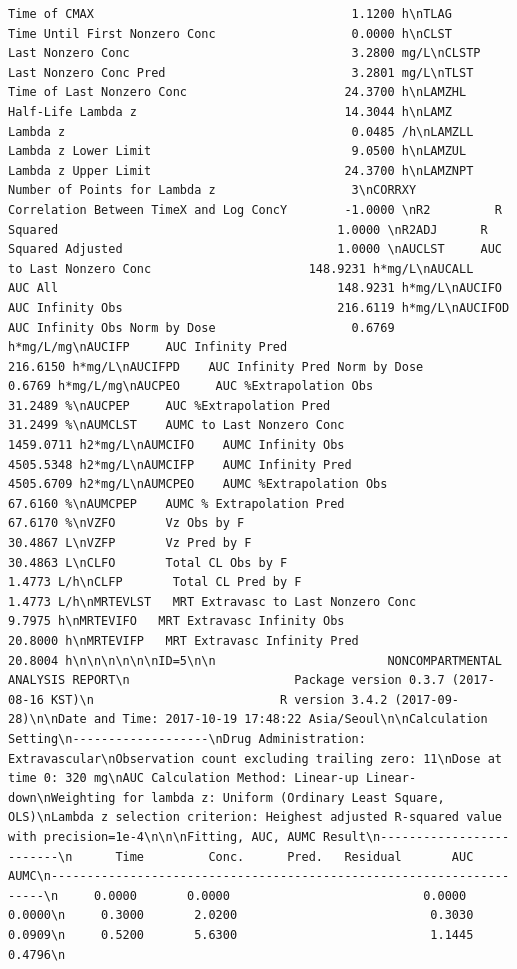 \documentclass[]{krantz}
\theoremstyle{definition}
\theoremstyle{definition}
\theoremstyle{definition}
\theoremstyle{remark}
\begin{document}
\begin{verbatim}
Time of CMAX                                    1.1200 h\nTLAG       Time Until First Nonzero Conc                   0.0000 h\nCLST       Last Nonzero Conc                               3.2800 mg/L\nCLSTP      Last Nonzero Conc Pred                          3.2801 mg/L\nTLST       Time of Last Nonzero Conc                      24.3700 h\nLAMZHL     Half-Life Lambda z                             14.3044 h\nLAMZ       Lambda z                                        0.0485 /h\nLAMZLL     Lambda z Lower Limit                            9.0500 h\nLAMZUL     Lambda z Upper Limit                           24.3700 h\nLAMZNPT    Number of Points for Lambda z                   3\nCORRXY     Correlation Between TimeX and Log ConcY        -1.0000 \nR2         R Squared                                       1.0000 \nR2ADJ      R Squared Adjusted                              1.0000 \nAUCLST     AUC to Last Nonzero Conc                      148.9231 h*mg/L\nAUCALL     AUC All                                       148.9231 h*mg/L\nAUCIFO     AUC Infinity Obs                              216.6119 h*mg/L\nAUCIFOD    AUC Infinity Obs Norm by Dose                   0.6769 h*mg/L/mg\nAUCIFP     AUC Infinity Pred                             216.6150 h*mg/L\nAUCIFPD    AUC Infinity Pred Norm by Dose                  0.6769 h*mg/L/mg\nAUCPEO     AUC %Extrapolation Obs                         31.2489 %\nAUCPEP     AUC %Extrapolation Pred                        31.2499 %\nAUMCLST    AUMC to Last Nonzero Conc                    1459.0711 h2*mg/L\nAUMCIFO    AUMC Infinity Obs                            4505.5348 h2*mg/L\nAUMCIFP    AUMC Infinity Pred                           4505.6709 h2*mg/L\nAUMCPEO    AUMC %Extrapolation Obs                        67.6160 %\nAUMCPEP    AUMC % Extrapolation Pred                      67.6170 %\nVZFO       Vz Obs by F                                    30.4867 L\nVZFP       Vz Pred by F                                   30.4863 L\nCLFO       Total CL Obs by F                               1.4773 L/h\nCLFP       Total CL Pred by F                              1.4773 L/h\nMRTEVLST   MRT Extravasc to Last Nonzero Conc              9.7975 h\nMRTEVIFO   MRT Extravasc Infinity Obs                     20.8000 h\nMRTEVIFP   MRT Extravasc Infinity Pred                    20.8004 h\n\n\n\n\n\nID=5\n\n                        NONCOMPARTMENTAL ANALYSIS REPORT\n                       Package version 0.3.7 (2017-08-16 KST)\n                          R version 3.4.2 (2017-09-28)\n\nDate and Time: 2017-10-19 17:48:22 Asia/Seoul\n\nCalculation Setting\n-------------------\nDrug Administration: Extravascular\nObservation count excluding trailing zero: 11\nDose at time 0: 320 mg\nAUC Calculation Method: Linear-up Linear-down\nWeighting for lambda z: Uniform (Ordinary Least Square, OLS)\nLambda z selection criterion: Heighest adjusted R-squared value with precision=1e-4\n\n\nFitting, AUC, AUMC Result\n-------------------------\n      Time         Conc.      Pred.   Residual       AUC       AUMC\n---------------------------------------------------------------------\n     0.0000       0.0000                           0.0000     0.0000\n     0.3000       2.0200                           0.3030     0.0909\n     0.5200       5.6300                           1.1445     0.4796\n 
\end{verbatim}
\end{document}
